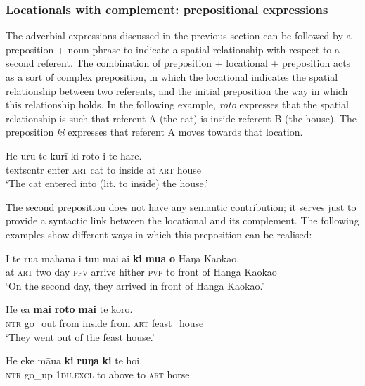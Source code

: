 \subsubsection[Locationals with complement: prepositional expressions]{Locationals with complement: prepositional expressions}\label{sec:3.6.2.2}
The adverbial expressions discussed in the previous section can be followed by a preposition + noun phrase to indicate a spatial relationship with respect to a second referent. The combination of preposition + locational + preposition acts as a sort of complex preposition, in which the locational indicates the spatial relationship between two referents, and the initial preposition the way in which this relationship holds. In the following example, \textit{roto} expresses that the spatial relationship is such that referent A (the cat) is inside referent B (the house). The preposition \textit{ki} expresses that referent A moves towards that location.

\ea\label{ex:3.133}
\gll He uru te kurī ki roto i te hare.\\
textsc{ntr} enter \textsc{art} cat to inside at \textsc{art} house \\

\glt
‘The cat entered into (lit. to inside) the house.’ \textstyleExampleref{[Notes]}
\z

The second preposition does not have any semantic contribution; it serves just to provide a syntactic link between the locational and its complement. The following examples show different ways in which this preposition can be realised:

\ea\label{ex:3.134}
\gll {\ꞌ}I te rua mahana i tu{\ꞌ}u mai ai \textbf{ki} \textbf{mu{\ꞌ}a} \textbf{o} Haŋa Kaokao. \\
at \textsc{art} two day \textsc{pfv} arrive hither \textsc{pvp} to front of Hanga Kaokao \\

\glt 
‘On the second day, they arrived in front of Hanga Kaokao.’ \textstyleExampleref{[R539-1.570]}
\z

\ea\label{ex:3.135}
\gll He e{\ꞌ}a \textbf{mai} \textbf{roto} \textbf{mai} te koro.\\
\textsc{ntr} go\_out from inside from \textsc{art} feast\_house\\

\glt 
‘They went out of the feast house.’ \textstyleExampleref{[Mtx-6-03.090]}
\z

\ea\label{ex:3.136}
\gll He eke māua \textbf{ki} \textbf{ruŋa} \textbf{ki} te hoi.\\
\textsc{ntr} go\_up \textsc{1du.excl} to above to \textsc{art} horse\\

